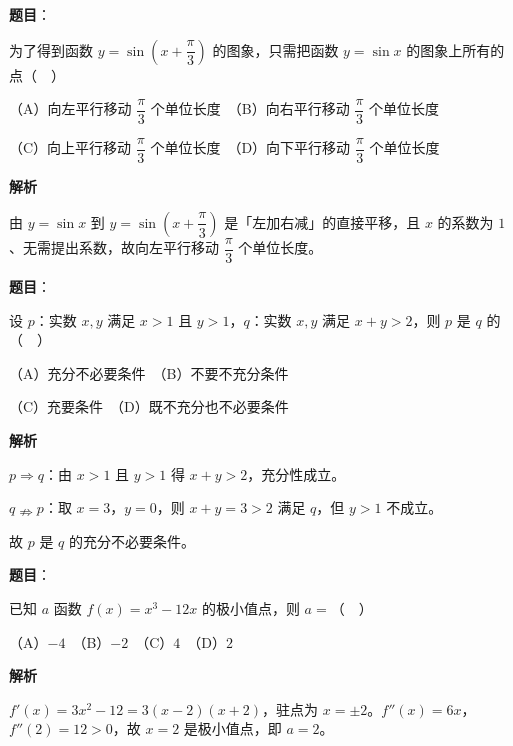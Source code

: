 \begin{answer}

\textbf{题目}：

为了得到函数 \(y=\sin\left(x+\dfrac{\pi}{3}\right)\) 的图象，只需把函数 \(y=\sin x\) 的图象上所有的点（　）

（A）向左平行移动 \(\dfrac{\pi}{3}\) 个单位长度　（B）向右平行移动 \(\dfrac{\pi}{3}\) 个单位长度

（C）向上平行移动 \(\dfrac{\pi}{3}\) 个单位长度　（D）向下平行移动 \(\dfrac{\pi}{3}\) 个单位长度

\textbf{解析}

由 \(y=\sin x\) 到 \(y=\sin\left(x+\dfrac{\pi}{3}\right)\) 是「左加右减」的直接平移，且 \(x\) 的系数为 \(1\)、无需提出系数，故向左平行移动 \(\dfrac{\pi}{3}\) 个单位长度。


\end{answer}
\begin{answer}

\textbf{题目}：

设 \(p\)：实数 \(x,y\) 满足 \(x>1\) 且 \(y>1\)，\(q\)：实数 \(x,y\) 满足 \(x+y>2\)，则 \(p\) 是 \(q\) 的（　）

（A）充分不必要条件　（B）不要不充分条件

（C）充要条件　（D）既不充分也不必要条件

\textbf{解析}

\(p\Rightarrow q\)：由 \(x>1\) 且 \(y>1\) 得 \(x+y>2\)，充分性成立。

\(q\nRightarrow p\)：取 \(x=3\)，\(y=0\)，则 \(x+y=3>2\) 满足 \(q\)，但 \(y>1\) 不成立。

故 \(p\) 是 \(q\) 的充分不必要条件。


\end{answer}
\begin{answer}

\textbf{题目}：

已知 \(a\) 函数 \(f(x)=x^{3}-12x\) 的极小值点，则 \(a=\)（　）

（A）\(-4\)　（B）\(-2\)　（C）\(4\)　（D）\(2\)

\textbf{解析}

\(f'(x)=3x^{2}-12=3(x-2)(x+2)\)，驻点为 \(x=\pm2\)。\(f''(x)=6x\)，\(f''(2)=12>0\)，故 \(x=2\) 是极小值点，即 \(a=2\)。


\end{answer}
